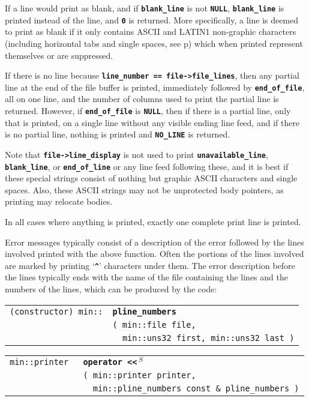 \documentclass[12pt]{article}
\makeatletter
\newcommand{\TT}[1]{{\tt \bfseries #1}}
\newcommand{\ttindex}[1]{\index{#1@{\tt #1}}}
\newcommand{\ttomkey}[3]{\TT{operator #2}\index{#1@{\tt operator #2}!{#3}}}
\newcommand{\pagref}[1]{p\pageref{#1}}
\newcommand{\EOL}{\penalty \exhyphenpenalty}
\newenvironment{indpar}[1][0.3in]%
	{\begin{list}{}%
		     {\setlength{\itemsep}{0in}%
		      \setlength{\topsep}{0in}%
		      \setlength{\parsep}{1ex}%
		      \setlength{\labelwidth}{#1}%
		      \setlength{\leftmargin}{#1}%
		      \addtolength{\leftmargin}{\labelsep}}%
	 \item}%
	{\end{list}}
\newcommand{\LABEL}[1]{\label{#1}}
\newlength{\ARGBREAKLENGTH}
\newcommand{\ARGBREAK}[1][\ARGBREAKLENGTH]{\\&\hspace*{#1}}
\newcommand{\TTOMKEY}[3]{\ttomkey{#1}{#2}{#3}}
\newcommand{\MINKEY}[1]%
	   {\TT{#1}\ttindex{min::#1}\ttindex{#1}}
\newcommand{\RESIZE}{$\,^S$}
\makeatother
\begin{document}
If a line would print as blank, and if
\TT{blank\_\EOL line} is not \TT{NULL},
\TT{blank\_\EOL line} is printed instead of the line, and \TT{0} is returned.
More specifically, a line is deemed to print as blank if it only contains
ASCII and LATIN1 non-graphic characters (including horizontal tabs and
single spaces, see \pagref{MIN::IS_GRAPHIC})
which when printed represent themselves or are suppressed.

If there is no line
because \TT{line\_\EOL number == file->\EOL file\_\EOL lines},
then any partial line at the end of the file buffer is printed,
immediately followed by \TT{end\_\EOL of\_\EOL file}, all on one line,
and the number of columns used to print the partial line is returned.
However, if \TT{end\_\EOL of\_\EOL file} is \TT{NULL}, then
if there is a partial line, only that is printed, on a single line
without any visible ending line feed, and if there is no partial line,
nothing is printed and \TT{NO\_\EOL LINE} is returned.

Note that
\TT{file->\EOL line\_\EOL display} is not used to print
\TT{unavailable\_\EOL line}, \TT{blank\_\EOL line}, or
\TT{end\_\EOL of\_\EOL line} or any line feed following these,
and it is best if these special strings consist of nothing but
graphic ASCII characters and single spaces.
Also, these ASCII strings may not be unprotected body pointers,
as printing may relocate bodies.

In all cases where anything is printed, exactly one complete print line is
printed.

Error messages typically consist of a description of the error
followed by the lines involved printed with the above function.
Often the portions of the lines involved are marked by printing
`\TT{\^{ }}' characters under them.  The error description before
the lines typically ends with the name of the file containing
the lines and the numbers of the lines, which can be produced
by the code:

\begin{indpar}[1em]\begin{tabular}{r@{}l}
\verb|(constructor) min::| & \MINKEY{pline\_numbers}\ARGBREAK
    \verb|( min::file file,|\ARGBREAK
    \verb|  min::uns32 first, min::uns32 last )|
\LABEL{MIN::PLINE_NUMBERS} \\
\end{tabular}\end{indpar}

\begin{indpar}[1em]\begin{tabular}{r@{}l}
\verb|min::printer |
    & \TTOMKEY{<<}{<{}<\RESIZE}%
              {of {\tt min::printer}}\ARGBREAK
      \verb|( min::printer printer,|\ARGBREAK
      \verb|  min::pline_numbers const & pline_numbers )|
\LABEL{PRINTER_OPERATOR<<_OF_PLINE_NUMBERS} \\
\end{tabular}\end{indpar}
\end{document}
